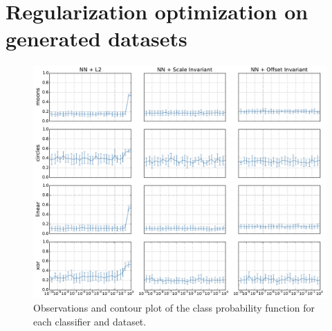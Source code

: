 
\onecolumn
\section{Regularization optimization on generated datasets}
\begin{figure}[H]
	\centering
	\includegraphics[width=\textwidth]{plots/syntetic_reg_opt}
	\caption{Observations and contour plot of the class probability function for each classifier and dataset.}
\end{figure}

\twocolumn
